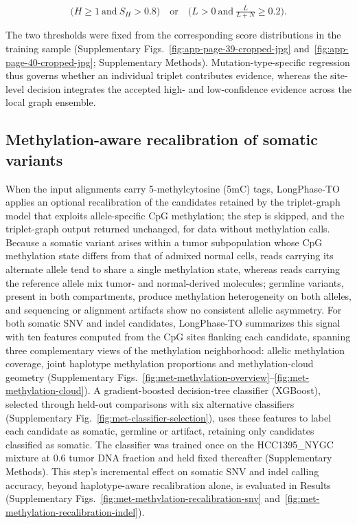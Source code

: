 \documentclass[pdflatex,sn-nature]{sn-jnl}
\begin{document}
\[
\bigl(H\geq1\ \text{and}\ S_H>0.8\bigr)
\quad\text{or}\quad
\bigl(L>0\ \text{and}\ \tfrac{L}{L+N}\geq0.2\bigr).
\]

The two thresholds were fixed from the corresponding score distributions in the training sample (Supplementary Figs.~\ref{fig:app-page-39-cropped-jpg} and~\ref{fig:app-page-40-cropped-jpg}; Supplementary Methods). Mutation-type-specific regression thus governs whether an individual triplet contributes evidence, whereas the site-level decision integrates the accepted high- and low-confidence evidence across the local graph ensemble.

\subsection{Methylation-aware recalibration of somatic variants}

When the input alignments carry 5-methylcytosine (5mC) tags, LongPhase-TO applies an optional recalibration of the candidates retained by the triplet-graph model that exploits allele-specific CpG methylation; the step is skipped, and the triplet-graph output returned unchanged, for data without methylation calls. Because a somatic variant arises within a tumor subpopulation whose CpG methylation state differs from that of admixed normal cells, reads carrying its alternate allele tend to share a single methylation state, whereas reads carrying the reference allele mix tumor- and normal-derived molecules; germline variants, present in both compartments, produce methylation heterogeneity on both alleles, and sequencing or alignment artifacts show no consistent allelic asymmetry. For both somatic SNV and indel candidates, LongPhase-TO summarizes this signal with ten features computed from the CpG sites flanking each candidate, spanning three complementary views of the methylation neighborhood: allelic methylation coverage, joint haplotype methylation proportions and methylation-cloud geometry (Supplementary Figs.~\ref{fig:met-methylation-overview}--\ref{fig:met-methylation-cloud}). A gradient-boosted decision-tree classifier (XGBoost), selected through held-out comparisons with six alternative classifiers (Supplementary Fig.~\ref{fig:met-classifier-selection}), uses these features to label each candidate as somatic, germline or artifact, retaining only candidates classified as somatic. The classifier was trained once on the HCC1395\_NYGC mixture at 0.6 tumor DNA fraction and held fixed thereafter (Supplementary Methods). This step's incremental effect on somatic SNV and indel calling accuracy, beyond haplotype-aware recalibration alone, is evaluated in Results (Supplementary Figs.~\ref{fig:met-methylation-recalibration-snv} and~\ref{fig:met-methylation-recalibration-indel}).
\end{document}
